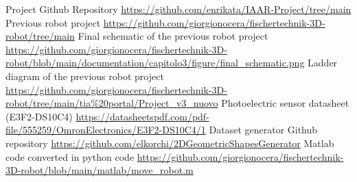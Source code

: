 \documentclass[a4paper,11pt]{report}
\theoremstyle{definition}
\theoremstyle{plain}
\begin{document}
\begin{thebibliography}{99}
    Project Github Repository \url{https://github.com/enrikata/IAAR-Project/tree/main}
   Previous robot project \url{https://github.com/giorgionocera/fischertechnik-3D-robot/tree/main}
    Final schematic of the previous robot project
    \url{https://github.com/giorgionocera/fischertechnik-3D-robot/blob/main/documentation/capitolo3/figure/final_schematic.png}
    Ladder diagram of the previous robot project
    \url{https://github.com/giorgionocera/fischertechnik-3D-robot/tree/main/tia%20portal/Project_v3_nuovo}
    Photoelectric sensor datasheet (E3F2-DS10C4) \url{https://datasheetspdf.com/pdf-file/555259/OmronElectronics/E3F2-DS10C4/1}
    Dataset generator Github repository \url{https://github.com/elkorchi/2DGeometricShapesGenerator}
    Matlab code converted in python code \url{https://github.com/giorgionocera/fischertechnik-3D-robot/blob/main/matlab/move_robot.m}
\end{thebibliography}
\end{document}
